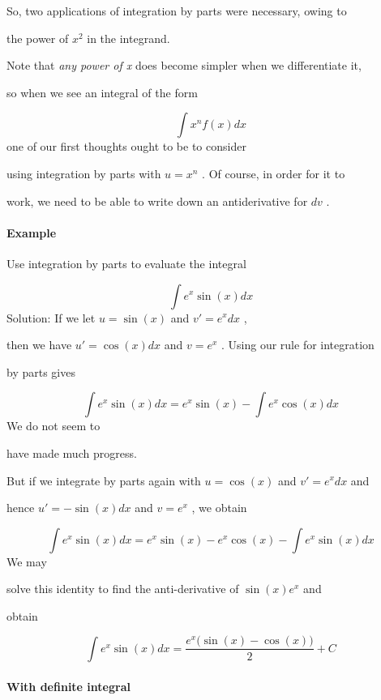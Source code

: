 So, two applications of integration by parts were necessary, owing to

the power of $x^2$ in the integrand.



Note that \textit{any power of x} does become simpler when we differentiate it,

so when we see an integral of the form



$$\int x^nf(x)dx$$ one of our first thoughts ought to be to consider

using integration by parts with $u=x^n$ . Of course, in order for it to

work, we need to be able to write down an antiderivative for $dv$ .



\paragraph{Example}



Use integration by parts to evaluate the integral



$$\int e^x\sin(x)dx$$ Solution: If we let $u=\sin(x)$ and $v'=e^xdx$ ,

then we have $u'=\cos(x)dx$ and $v=e^x$ . Using our rule for integration

by parts gives



$$\int e^x\sin(x)dx=e^x\sin(x)-\int e^x\cos(x)dx$$ We do not seem to

have made much progress.



But if we integrate by parts again with $u=\cos(x)$ and $v'=e^xdx$ and

hence $u'=-\sin(x)dx$ and $v=e^x$ , we obtain



$$\int e^x\sin(x)dx=e^x\sin(x)-e^x\cos(x)-\int e^x\sin(x)dx$$ We may

solve this identity to find the anti-derivative of $\sin(x)e^x$ and

obtain



$$\int e^x\sin(x)dx=\frac{e^x\big(\sin(x)-\cos(x)\big)}{2}+C$$



\paragraph{With definite integral}



